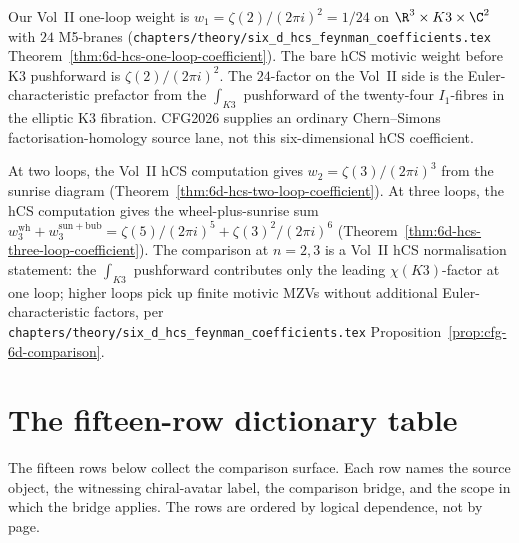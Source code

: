 \begin{remark}
\label{rem:cfg-feynman-one-loop}
Our Vol~II one-loop weight is
$w_1 = \zeta(2)/(2\pi i)^2 = 1/24$ on
$\R^3\times K3\times\C^2$ with $24$ M5-branes
(\texttt{chapters/theory/six\_d\_hcs\_feynman\_coefficients.tex}
Theorem~\ref{thm:6d-hcs-one-loop-coefficient}). The bare hCS motivic
weight before K3 pushforward is $\zeta(2)/(2\pi i)^2$. The $24$-factor
on the Vol~II side is the Euler-characteristic prefactor from the
$\int_{K3}$ pushforward of the twenty-four $I_1$-fibres in the elliptic
K3 fibration. CFG2026 supplies an ordinary Chern--Simons
factorisation-homology source lane, not this six-dimensional hCS
coefficient.
\end{remark}

\begin{remark}
\label{rem:cfg-feynman-higher-loop}
At two loops, the Vol~II hCS computation gives
$w_2 = \zeta(3)/(2\pi i)^3$ from the sunrise diagram
(Theorem~\ref{thm:6d-hcs-two-loop-coefficient}). At three loops, the
hCS computation gives the wheel-plus-sunrise sum
$w_3^{\mathrm{wh}} + w_3^{\mathrm{sun+bub}}
= \zeta(5)/(2\pi i)^5 + \zeta(3)^2/(2\pi i)^6$
(Theorem~\ref{thm:6d-hcs-three-loop-coefficient}). The comparison at
$n = 2,3$ is a Vol~II hCS normalisation statement: the
$\int_{K3}$ pushforward contributes only the leading
$\chi(K3)$-factor at one loop; higher loops pick up finite motivic
MZVs without additional Euler-characteristic factors, per
\texttt{chapters/theory/six\_d\_hcs\_feynman\_coefficients.tex}
Proposition~\ref{prop:cfg-6d-comparison}.
\end{remark}

\section{The fifteen-row dictionary table}
\label{sec:cfg-fifteen-row-table}

The fifteen rows below collect the comparison surface. Each row names
the source object, the witnessing chiral-avatar label, the comparison
bridge, and the scope in which the bridge applies. The rows are ordered
by logical dependence, not by page.

